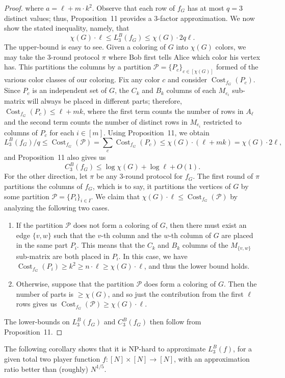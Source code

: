 \documentclass[10pt,a4paper]{article}
\begin{document}
\begin{proof}
where $a=\ell+m\cdot k^2$. Observe that each row of $f_G$ has at most $q=3$ distinct values; thus, Proposition~11 provides a 3-factor approximation. We now show the stated inequality, namely, that
\[\chi(G)\cdot\ell\le L_3^B(f_G)\le\chi(G)\cdot2q\ell.\]
The upper-bound is easy to see. Given a coloring of $G$ into $\chi(G)$ colors, we may take the 3-round protocol $\pi$ where Bob first tells Alice which color his vertex has. This partitions the columns by a partition $\mathcal P=\{P_c\}_{c\in[\chi(G)]}$ formed of the various color classes of our coloring. Fix any color $c$ and consider $\operatorname{Cost}_{f_G}(P_c)$. Since $P_c$ is an independent set of $G$, the $C_k$ and $B_k$ columns of each $M_{e_i}$ sub-matrix will always be placed in different parts; therefore, $\operatorname{Cost}_{f_G}(P_c)\le\ell+mk$, where the first term counts the number of rows in $A_\ell$ and the second term counts the number of distinct rows in $M_{e_i}$ restricted to columns of $P_c$ for each $i\in[m]$. Using Proposition~11, we obtain
\[L_3^B(f_G)/q\le\operatorname{Cost}_{f_G}(\mathcal P)=\sum_c\operatorname{Cost}_{f_G}(P_c)\le\chi(G)\cdot(\ell+mk)=\chi(G)\cdot2\ell,\]
and Proposition~11 also gives us
\[C_3^B(f_G)\le\log\chi(G)+\log\ell+O(1).\]
For the other direction, let $\pi$ be any 3-round protocol for $f_G$. The first round of $\pi$ partitions the columns of $f_G$, which is to say, it partitions the vertices of $G$ by some partition $\mathcal P=\{P_i\}_{i\in I}$. We claim that $\chi(G)\cdot\ell\le\operatorname{Cost}_{f_G}(\mathcal P)$ by analyzing the following two cases.
\begin{enumerate}
\item If the partition $\mathcal P$ does not form a coloring of $G$, then there must exist an edge $\{v,w\}$ such that the $v$-th column and the $w$-th column of $G$ are placed in the same part $P_i$. This means that the $C_k$ and $B_k$ columns of the $M_{\{v,w\}}$ sub-matrix are both placed in $P_i$. In this case, we have $\operatorname{Cost}_{f_G}(P_i)\ge k^2\ge n\cdot\ell\ge\chi(G)\cdot\ell$, and thus the lower bound holds.
\item Otherwise, suppose that the partition $\mathcal P$ does form a coloring of $G$. Then the number of parts is $\ge\chi(G)$, and so just the contribution from the first $\ell$ rows gives us $\operatorname{Cost}_{f_G}(\mathcal P)\ge\chi(G)\cdot\ell$.
\end{enumerate}
The lower-bounds on $L_3^B(f_G)$ and $C_3^B(f_G)$ then follow from Proposition~11.
\end{proof}
The following corollary shows that it is NP-hard to approximate $L_3^B(f)$, for a given total two player function $f:[N]\times[N]\to[N]$, with an approximation ratio better than (roughly) $N^{1/5}$.
\end{document}
